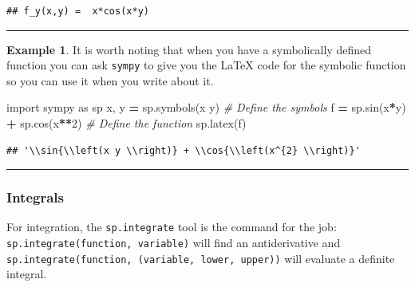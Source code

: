 \documentclass[
]{book}
\newenvironment{Shaded}{\begin{snugshade}}{\end{snugshade}}
\newcommand{\CommentTok}[1]{\textcolor[rgb]{0.56,0.35,0.01}{\textit{#1}}}
\newcommand{\DecValTok}[1]{\textcolor[rgb]{0.00,0.00,0.81}{#1}}
\newcommand{\ImportTok}[1]{#1}
\newcommand{\NormalTok}[1]{#1}
\newcommand{\OperatorTok}[1]{\textcolor[rgb]{0.81,0.36,0.00}{\textbf{#1}}}
\newcommand{\StringTok}[1]{\textcolor[rgb]{0.31,0.60,0.02}{#1}}
\theoremstyle{definition}
\theoremstyle{definition}
\newtheorem{example}{Example}[chapter]
\theoremstyle{definition}
\theoremstyle{remark}
\begin{document}
\begin{verbatim}
## f_y(x,y) =  x*cos(x*y)
\end{verbatim}

\begin{center}\rule{0.5\linewidth}{0.5pt}\end{center}

\begin{example}
\protect\hypertarget{exm:unnamed-chunk-800}{}{\label{exm:unnamed-chunk-800} }It is worth noting that when you have a symbolically defined function you can ask \texttt{sympy} to give you the LaTeX code for the symbolic function so you can use it when you write about it.
\end{example}

\begin{Shaded}
\begin{Highlighting}[]
\ImportTok{import}\NormalTok{ sympy }\ImportTok{as}\NormalTok{ sp}
\NormalTok{x, y }\OperatorTok{=}\NormalTok{ sp.symbols(}\StringTok{\textquotesingle{}x y\textquotesingle{}}\NormalTok{) }\CommentTok{\# Define the symbols}
\NormalTok{f }\OperatorTok{=}\NormalTok{ sp.sin(x}\OperatorTok{*}\NormalTok{y) }\OperatorTok{+}\NormalTok{ sp.cos(x}\OperatorTok{**}\DecValTok{2}\NormalTok{) }\CommentTok{\# Define the function}
\NormalTok{sp.latex(f)}
\end{Highlighting}
\end{Shaded}

\begin{verbatim}
## '\\sin{\\left(x y \\right)} + \\cos{\\left(x^{2} \\right)}'
\end{verbatim}

\begin{center}\rule{0.5\linewidth}{0.5pt}\end{center}

\hypertarget{integrals}{%
\subsubsection{Integrals}\label{integrals}}

For integration, the \texttt{sp.integrate} tool is the command for the job: \texttt{sp.integrate(function,\ variable)} will find an antiderivative and \texttt{sp.integrate(function,\ (variable,\ lower,\ upper))} will evaluate a definite integral.
\end{document}
